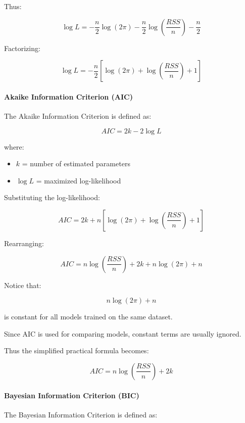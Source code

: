 \documentclass[10pt,a4paper]{article}
\begin{document}
	Thus:
	
	\[
	\log L
	=
	-\frac{n}{2}\log(2\pi)
	-
	\frac{n}{2}\log
	\left(
	\frac{RSS}{n}
	\right)
	-
	\frac{n}{2}
	\]
	
	Factorizing:
	
	\[
	\boxed{
	\log L
	=
	-\frac{n}{2}
	\left[
	\log(2\pi)
	+
	\log\left(\frac{RSS}{n}\right)
	+
	1
	\right]
	}
	\]
	
	\vspace{0.5em}
	
	\paragraph{Akaike Information Criterion (AIC)}
	
	The Akaike Information Criterion is defined as:
	
	\[
	\boxed{
	AIC = 2k - 2\log L
	}
	\]
	
	where:
	
	\begin{itemize}
		\item \(k\) = number of estimated parameters
		\item \(\log L\) = maximized log-likelihood
	\end{itemize}
	
	Substituting the log-likelihood:
	
	\[
	AIC
	=
	2k
	+
	n
	\left[
	\log(2\pi)
	+
	\log\left(\frac{RSS}{n}\right)
	+
	1
	\right]
	\]
	
	Rearranging:
	
	\[
	AIC
	=
	n\log\left(\frac{RSS}{n}\right)
	+
	2k
	+
	n\log(2\pi)
	+
	n
	\]
	
	Notice that:
	
	\[
	n\log(2\pi)+n
	\]
	
	is constant for all models trained on the same dataset.
	
	Since AIC is used for comparing models, constant terms are usually ignored.
	
	Thus the simplified practical formula becomes:
	
	\[
	\boxed{
	AIC
	=
	n\log\left(\frac{RSS}{n}\right)
	+
	2k
	}
	\]
	
	\vspace{0.5em}
	
	\paragraph{Bayesian Information Criterion (BIC)}
	
	The Bayesian Information Criterion is defined as:
	
\end{document}
